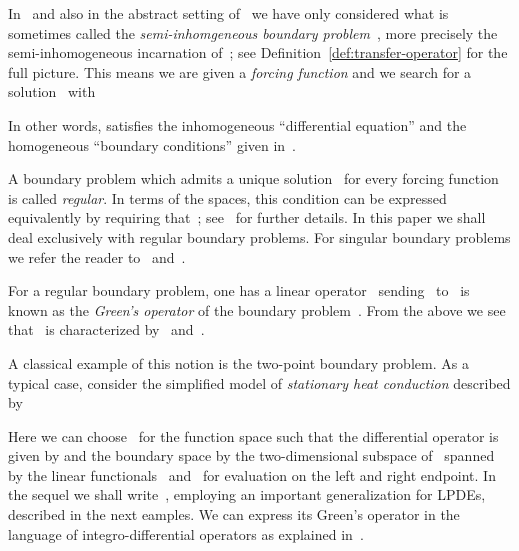 \documentclass[a4paper]{llncs}
\begin{document}
In~\cite{Rosenkranz2005,RosenkranzRegensburger2008a} and also in the abstract
setting of~\cite{RegensburgerRosenkranz2009} we have only considered what is
sometimes called the \emph{semi-inhomgeneous boundary
  problem}~\cite{Stakgold1979}, more precisely the semi-inhomogeneous
incarnation of~; see Definition~\ref{def:transfer-operator}
for the full picture. This means we are given a \emph{forcing function}  and we search for a solution~ with

In other words,  satisfies the inhomogeneous ``differential equation''  and the homogeneous ``boundary conditions''  given
in~.

A boundary problem which admits a unique solution~ for every
forcing function~ is called \emph{regular}. In terms of the
spaces, this condition can be expressed equivalently by requiring that~; see~\cite{RegensburgerRosenkranz2009} for
further details. In this paper we shall deal exclusively with regular boundary
problems. For singular boundary problems we refer the reader
to~\cite{KorporalRegensburgerRosenkranz2011} and~\cite{Korporal2012}.

For a regular boundary problem, one has a linear operator~ sending~ to~ is known as the \emph{Green's operator} of the
boundary problem~. From the above we see that~ is
characterized by~ and~.

\begin{myexample}
  \label{ex:heat-conduction}
  A classical example of this notion is the two-point boundary problem. As a
  typical case, consider the simplified model of \emph{stationary heat
    conduction} described by

Here we can choose~ for the function space
  such that the differential operator is given by  and the boundary space by the two-dimensional subspace
  of~ spanned by the linear functionals~ and~ for evaluation on the left and right
  endpoint. In the sequel we shall write~, employing an
  important generalization for LPDEs, described in the next eamples. We can
  express its Green's operator in the language of integro-differential operators
  as explained in~\cite{RosenkranzRegensburger2008a}.
\end{myexample}
\end{document}
